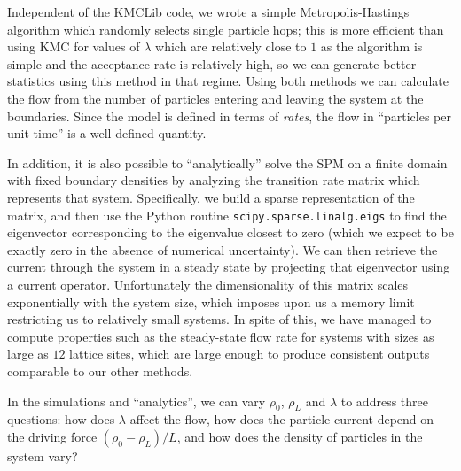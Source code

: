 \documentclass[
reprint, amsmath,amssymb,
]{revtex4-1}
\begin{document}
Independent of the KMCLib code, we wrote a simple Metropolis-Hastings
algorithm which randomly selects single particle hops; this is more efficient than using KMC for values of
$\lambda$ which are relatively close to $1$ as the algorithm is simple and the acceptance rate is relatively high, so we can generate better statistics using this method in that regime.
Using both methods we can calculate the flow from the number of particles entering and
leaving the system at the boundaries.  Since the model is defined in
terms of {\it rates}, the flow in ``particles per unit time'' is a well
defined quantity.

In addition, it is also possible
to ``analytically'' solve the SPM on a finite domain with fixed boundary densities by analyzing the transition rate matrix which represents that system.
Specifically, we build a sparse representation of the matrix, and then use the Python routine \texttt{scipy.sparse.linalg.eigs} to find the eigenvector corresponding to the eigenvalue closest to zero
(which we expect to be exactly zero in the absence of numerical uncertainty). We can then retrieve the current through the system in a steady state by projecting that eigenvector using a current operator.
Unfortunately the dimensionality of this matrix scales exponentially with the system size, which imposes upon us a memory limit restricting us to
relatively small systems. In spite of this, we have managed to compute properties such as the steady-state flow rate for systems with sizes as large as $12$ lattice sites,
which are large enough to produce consistent outputs comparable to our other methods.


In the simulations and ``analytics'', we can vary $\rho_0$, $\rho_L$ and $\lambda$ to
address three questions: how does $\lambda$ affect the flow, how does
the particle current depend on the driving force $(\rho_0 - \rho_L)/L$, and
how does the density of particles in the system vary?
\end{document}
